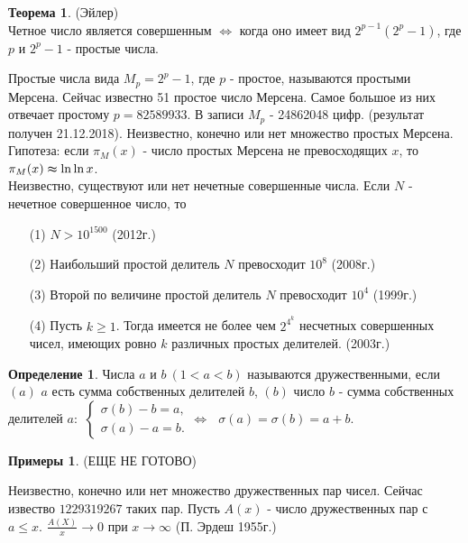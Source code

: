 \documentclass[a4paper, 12pt]{article}
\newcommand{\lra}{\Leftrightarrow}
\theoremstyle{definition}
\newtheorem{definition}{Определение}[section]
\newtheorem{theorem}{Теорема}[section]
\newtheorem*{examples}{Примеры}
\begin{document}
    \begin{theorem} (Эйлер)\\
        Четное число является совершенным $\lra$ когда оно имеет вид $2^{p-1}(2^p-1)$, где $p$ и $2^p-1$ - простые числа.
    \end{theorem} 
    Простые числа вида $M_p=2^p-1$, где $p$ - простое, называются простыми Мерсена. Сейчас известно 51 простое число Мерсена. Самое большое из них отвечает простому $p=82589933$. В записи $M_p$ - 24862048 цифр. (результат получен 21.12.2018). Неизвестно, конечно или нет множество простых Мерсена. Гипотеза: если $\pi_M(x)$ - число простых Мерсена не превосходящих $x$, то\\
    $\pi_M(x)\thickapprox \ln\ln x$.\\
    Неизвестно, существуют или нет нечетные совершенные числа. Если $N$ - нечетное совершенное число, то
    \begin{itemize}
        \item[(1)] $N>10^{1500}$ (2012г.)
        \item[(2)] Наибольший простой делитель $N$ превосходит $10^8$ (2008г.)
        \item[(3)] Второй по величине простой делитель $N$ превосходит $10^4$ (1999г.)
        \item[(4)] Пусть $k\geq 1$. Тогда имеется не более чем $2^{4^k}$ несчетных совершенных чисел, имеющих ровно $k$ различных простых делителей. (2003г.)  
    \end{itemize}
    \begin{definition}
        Числа $a$ и $b\ (1<a<b)$ называются дружественными, если $(a)$ $a$ есть сумма собственных делителей $b$, $(b)$ число $b$ - сумма собственных делителей $a$:
         $\ \begin{cases}
            \sigma(b)-b=a,\\
            \sigma(a)-a=b.
         \end{cases} \lra\ \ \ \sigma(a)=\sigma(b)=a+b$.   
    \end{definition}
    \begin{examples}
        (ЕЩЕ НЕ ГОТОВО)
    \end{examples}
    Неизвестно, конечно или нет множество дружественных пар чисел. Сейчас извество $1229319267$ таких пар.
    Пусть $A(x)$ - число дружественных пар с $a\leq x$. $\frac{A(X)}{x}\to 0$ при $x\to \infty$ (П. Эрдеш 1955г.)
    \newpage
\end{document}
